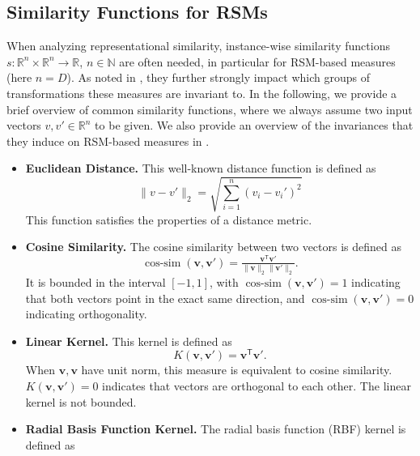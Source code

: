 \documentclass{article}
\newcommand{\Nat}{\mathbb{N}}
\newcommand{\Real}{\mathbb{R}}
\newcommand{\transp}{\mathsf{T}}
\begin{document}
\begin{refsegment}
\subsection{Similarity Functions for RSMs}\label{sec:simfct}
When analyzing representational similarity, instance-wise similarity functions $s: \Real^n\times \Real^n\longrightarrow \Real$, $n\in\Nat$ are often needed, in particular for RSM-based measures (here $n=D$).
As noted in , they further strongly impact which groups of transformations these measures are invariant to.
In the following, we provide a brief overview of common similarity functions, where we always assume two input vectors $v,v'\in\Real^n$ to be given.
We also provide an overview of the invariances that they induce on RSM-based measures in .
\begin{itemize}
    \item \textbf{Euclidean Distance.}
    This well-known distance function is defined as
    \begin{equation}
        \|v - v'\|_2 = \sqrt{\textstyle\sum_{i=1}^n (v_i - v_i')^2}
    \end{equation}
    This function satisfies the properties of a distance metric.
    \item \textbf{Cosine Similarity.}
    The cosine similarity between two vectors is defined as
    \begin{equation}\label{eq:cos-sim}
        \operatorname{cos-sim}(\bm{v}, \bm{v}') = \tfrac{ \bm{v}^\transp \bm{v}'}{\|\bm{v}\|_2 \|\bm{v}'\|_2}.
    \end{equation}
    It is bounded in the interval $[-1,1]$, with $\operatorname{cos-sim}(\bm{v}, \bm{v}') = 1$ indicating that both vectors point in the exact same direction, and $\operatorname{cos-sim}(\bm{v}, \bm{v}') = 0$ indicating orthogonality.
    \item \textbf{Linear Kernel.}
    This kernel is defined as
    \begin{equation}\label{eq:linkernel}
        K(\bm{v}, \bm{v}') = \bm{v}^\transp \bm{v}'.
    \end{equation}
    When $\bm{v}, \bm{v}$ have unit norm, this measure is equivalent to cosine similarity.
    $K(\bm{v}, \bm{v}') = 0$ indicates that vectors are orthogonal to each other.
    The linear kernel is not bounded.
    \item \textbf{Radial Basis Function Kernel.}
    The radial basis function (RBF) kernel is defined as
    \begin{equation}\label{eq:rbfkernel}

\end{equation}
\end{itemize}
\end{refsegment}
\end{document}
